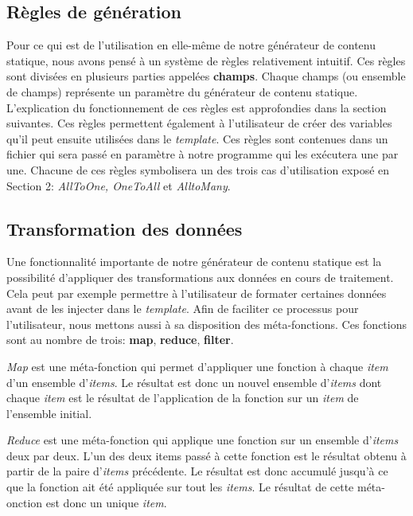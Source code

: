 	\subsection{Règles de génération}
		Pour ce qui est de l'utilisation en elle-même de notre générateur de contenu statique, nous avons pensé à un système de règles relativement intuitif.
		Ces règles sont divisées en plusieurs parties appelées \textbf{champs}. Chaque champs (ou ensemble de champs) représente un paramètre du générateur de contenu statique.	L'explication du fonctionnement de ces règles est approfondies dans la section suivantes. Ces règles permettent également à l'utilisateur de créer des variables qu'il peut ensuite utilisées dans le \textit{template}. Ces règles sont contenues dans un fichier qui sera passé en paramètre à notre programme qui les exécutera une par une. Chacune de ces règles symbolisera un des trois cas d'utilisation exposé en Section 2: \textit{AllToOne, OneToAll} et \textit{AlltoMany}.
		
	\subsection{Transformation des données}
	
		Une fonctionnalité importante de notre générateur de contenu statique est la possibilité d'appliquer des transformations aux données en cours de traitement. Cela peut par exemple permettre à l'utilisateur de formater certaines données avant de les injecter dans le \textit{template}. Afin de faciliter ce processus pour l'utilisateur, nous mettons aussi à sa disposition des méta-fonctions. Ces fonctions sont au nombre de trois: \textbf{map}, \textbf{reduce}, \textbf{filter}. 
		
		\textit{Map} est une méta-fonction qui permet d'appliquer une fonction à chaque \textit{item} d'un ensemble d'\textit{items}. Le résultat est donc un nouvel ensemble d'\textit{items} dont chaque  \textit{item} est le résultat de l'application de la fonction sur un \textit{item} de l'ensemble initial.
		
		\textit{Reduce} est une méta-fonction qui applique une fonction sur un ensemble d'\textit{items} deux par deux. L'un des deux items passé à cette fonction est le résultat obtenu à partir de la paire d'\textit{items} précédente. Le résultat est donc accumulé jusqu'à ce que la fonction ait été appliquée sur tout les \textit{items}. Le résultat de cette méta-onction est donc un unique \textit{item}.
		
